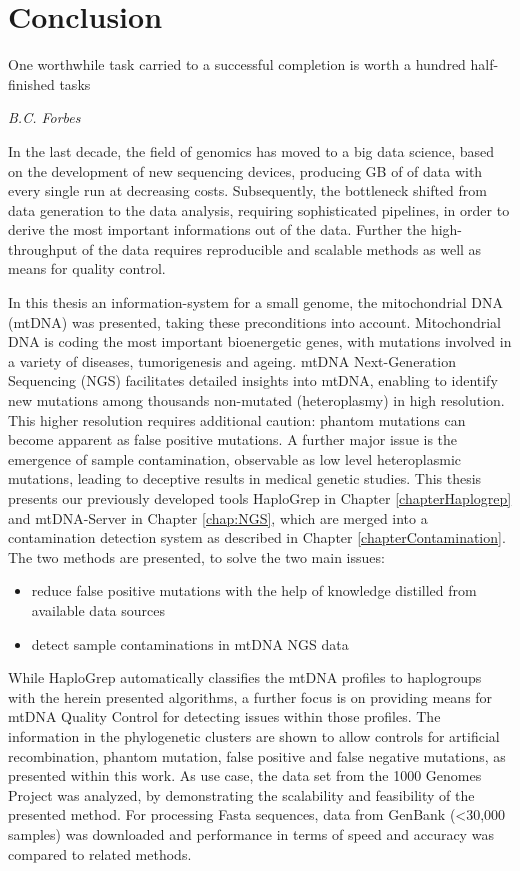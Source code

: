 \chapter{Conclusion}
\label{chap:conclusion}

\epigraph{One worthwhile task carried to a successful completion is worth a hundred half-finished tasks}{\textit{B.C. Forbes}}

In the last decade, the  field of genomics has moved to a big data science, based on the development of new sequencing devices, producing GB of of data with every single run at decreasing costs. Subsequently, the bottleneck shifted from data generation to the data analysis, requiring sophisticated pipelines, in order to derive the most important informations out of the data. Further the high-throughput of the data requires reproducible and scalable methods as well as means for quality control. 

In this thesis an information-system for a small genome, the mitochondrial DNA (mtDNA) was presented, taking these preconditions into account. Mitochondrial DNA is coding the most important bioenergetic genes, with mutations involved in a variety of diseases, tumorigenesis and ageing. mtDNA Next-Generation Sequencing (NGS) facilitates detailed insights into mtDNA, enabling to identify new mutations among thousands non-mutated (heteroplasmy) in high resolution. This higher resolution requires additional caution: phantom mutations can become apparent as false positive mutations. A further major issue is the emergence of sample contamination, observable as low level heteroplasmic mutations, leading to deceptive results in medical genetic studies.
This thesis presents our previously developed tools HaploGrep in Chapter \ref{chapterHaplogrep} and mtDNA-Server in Chapter \ref{chap:NGS}, which are merged into a contamination detection system as described in Chapter \ref{chapterContamination}. The two methods are presented, to solve the two main issues:
\begin{itemize}
\item reduce false positive mutations with the help of knowledge distilled from available data sources  
\item detect sample contaminations in mtDNA NGS data
\end{itemize}
While HaploGrep automatically classifies the mtDNA profiles to haplogroups with the herein presented algorithms, a further focus is on providing means for mtDNA Quality Control for detecting issues within those profiles. The information in the phylogenetic clusters are shown to allow controls for artificial recombination, phantom mutation, false positive and false negative mutations, as presented within this work. As use case, the data set from the 1000 Genomes Project was analyzed, by demonstrating the scalability and feasibility of the presented method. For processing Fasta sequences, data from GenBank (<30,000 samples) was downloaded and performance in terms of speed and accuracy was compared to related methods.

